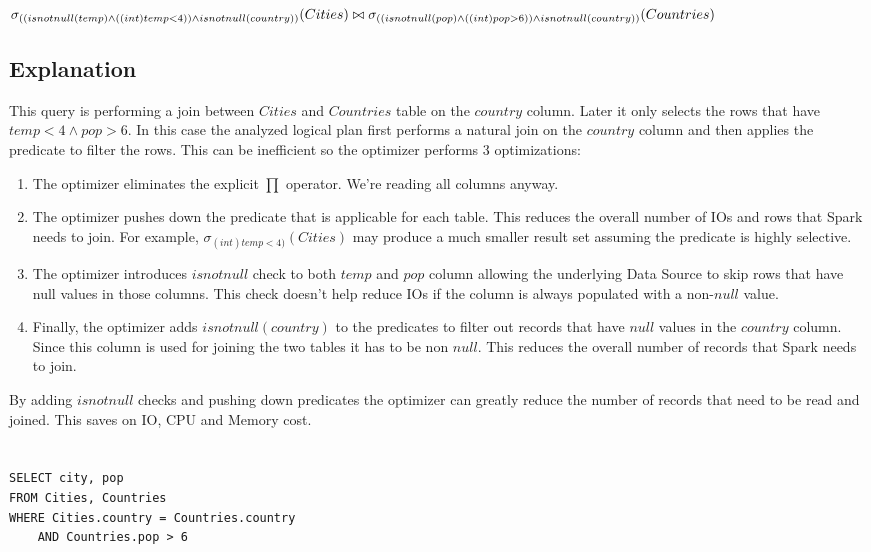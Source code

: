 \documentclass[12pt]{article}
\begin{document}
$\sigma_{((isnotnull(temp) \wedge ((int)temp < 4)) \wedge isnotnull(country))}(Cities) \bowtie \\
\sigma_{((isnotnull(pop) \wedge ((int)pop > 6)) \wedge isnotnull(country))}(Countries)$

\subsection*{Explanation}

This query is performing a join between $Cities$ and $Countries$ table on the $country$ column. Later it only selects the rows that have $temp < 4 \wedge pop > 6$. In this case the analyzed logical plan first performs a natural join on the $country$ column and then applies the predicate to filter the rows. This can be inefficient so the optimizer performs 3 optimizations:

\begin{enumerate}
\item The optimizer eliminates the explicit $\prod$ operator. We're reading all columns anyway.

\item The optimizer pushes down the predicate that is applicable for each table. This reduces the overall number of IOs and rows that Spark needs to join. For example, $\sigma_{(int)temp < 4)}(Cities)$ may produce a much smaller result set assuming the predicate is highly selective.


\item The optimizer introduces $isnotnull$ check to both $temp$ and $pop$ column allowing the underlying Data Source to skip rows that have null values in those columns. This check doesn't help reduce IOs if the column is always populated with a non-$null$ value.

\item Finally, the optimizer adds $isnotnull(country)$ to the predicates to filter out records that have $null$ values in the $country$ column. Since this column is used for joining the two tables it has to be non $null$. This reduces the overall number of records that Spark needs to join.

\end{enumerate}

By adding $isnotnull$ checks and pushing down predicates the optimizer can greatly reduce the number of records that need to be read and joined. This saves on IO, CPU and Memory cost.
\newpage

\section{}
\begin{verbatim}
SELECT city, pop
FROM Cities, Countries
WHERE Cities.country = Countries.country
    AND Countries.pop > 6
\end{verbatim}
\end{document}
